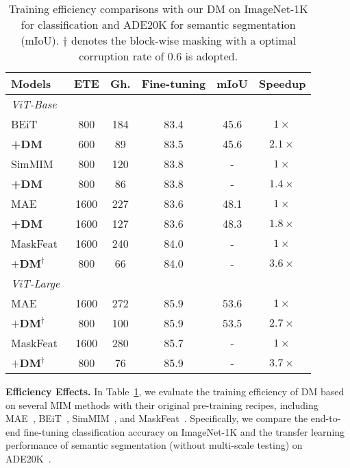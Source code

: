 \documentclass[lettersize,journal]{IEEEtran}
\begin{document}
\begin{table}[t]
\begin{center}
  \caption{Training efficiency comparisons with our DM on ImageNet-1K for classification and ADE20K for semantic segmentation (mIoU). $\dagger $ denotes the block-wise masking with a optimal corruption rate of 0.6 is adopted.}
  \label{tab:efficient}
      \begin{tabular}{lccccc}
        \toprule
        Models        & ETE & Gh. & Fine-tuning & mIoU & Speedup \\
        \midrule
        \emph{ViT-Base}       \\
        BEiT~\cite{2021arXiv210608254B} & 800 & 184 & 83.4 & 45.6 & $1\times$ \\
        \rowcolor{mygray} \quad \textbf{+DM} &   600   & 89 & 83.5 & 45.6 & $2.1\times$ \\
        SimMIM~\cite{2021arXiv211109886X} &   800   & 120 & 83.8 & - & $1\times$ \\
        \rowcolor{mygray} \quad \textbf{+DM} &   800   & 86 & 83.8 & - & $1.4\times$ \\
        MAE~\cite{2021arXiv211106377H} &   1600   & 227 & 83.6 & 48.1 & $1\times$ \\
        \rowcolor{mygray} \quad \textbf{+DM} &   1600   & 127 & 83.6 & 48.3 & $1.8\times$ \\
        MaskFeat~\cite{2021arXiv211209133W} &  1600  & 240 & 84.0 & - & $1\times$ \\
        \rowcolor{mygray} \quad $\textbf{+DM}^\dagger$ &  800  & 66 & 84.0 & - & $3.6\times$ \\
        \midrule
        \emph{ViT-Large}      \\
        MAE~\cite{2021arXiv211106377H} &   1600  & 272 & 85.9 & 53.6 & $1\times$ \\
        \rowcolor{mygray} \quad $\textbf{+DM}^\dagger$ & 800 & 100 & 85.9 & 53.5 & $2.7\times$ \\
        MaskFeat~\cite{2021arXiv211209133W} &  1600  & 280 & 85.7 & - & $1\times$ \\
        \rowcolor{mygray} \quad $\textbf{+DM}^\dagger$ &  800  & 76 & 85.9 & - & $3.7\times$ \\
        \bottomrule
      \end{tabular}
\end{center}
\end{table}

\textbf{Efficiency Effects.}
In Table~\ref{tab:efficient}, we evaluate the training efficiency of DM based on several MIM methods with their original pre-training recipes, including MAE~\cite{2021arXiv211106377H}, BEiT~\cite{2021arXiv210608254B}, SimMIM~\cite{2021arXiv211109886X}, and MaskFeat~\cite{2021arXiv211209133W}. 
Specifically, we compare the end-to-end fine-tuning classification accuracy on ImageNet-1K and the transfer learning performance of semantic segmentation (without multi-scale testing) on ADE20K~\cite{Zhou2017ScenePT}. 
\end{document}
